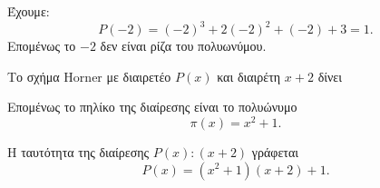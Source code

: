 \begin{alist}
\item Έχουμε:
\[P(-2) = (-2)^3 + 2(-2)^2 + (-2) + 3 = 1.\]
Επομένως το $-2$ δεν είναι ρίζα του πολυωνύμου.
\item Το σχήμα Horner με διαιρετέο $P(x)$ και διαιρέτη $x + 2$ δίνει
\begin{center}
\end{center}
Επομένως το πηλίκο της διαίρεσης είναι το πολυώνυμο
\[\pi(x) = x^2 + 1.\]
\item Η ταυτότητα της διαίρεσης $P(x) : (x + 2)$ γράφεται
\[P(x) = (x^2 + 1)(x + 2) + 1.\]
\end{alist}

